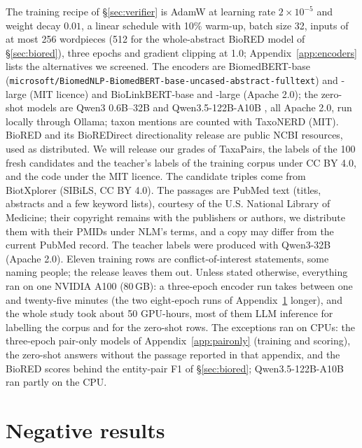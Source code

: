 \documentclass[11pt]{article}
\newcommand{\bench}{\mbox{TaxaPairs}}
\begin{document}
The training recipe of \S\ref{sec:verifier} is AdamW \citep{loshchilov2019decoupled} at learning rate $2\times10^{-5}$ and weight
decay $0.01$, a linear schedule with 10\% warm-up, batch size 32, inputs of at most 256 wordpieces (512 for the whole-abstract BioRED model of \S\ref{sec:biored}),
three epochs and gradient clipping at 1.0; Appendix~\ref{app:encoders} lists the alternatives we
screened. The encoders are BiomedBERT-base
(\texttt{microsoft/\allowbreak BiomedNLP-\allowbreak BiomedBERT-\allowbreak base-\allowbreak uncased-\allowbreak abstract-\allowbreak fulltext})
and -large (MIT licence) and BioLinkBERT-base and -large (Apache 2.0); the zero-shot models are Qwen3 0.6B--32B \citep{qwen2025technical} and Qwen3.5-122B-A10B \citep{qwen2026qwen35}, all Apache 2.0, run locally through
Ollama; taxon mentions are counted with TaxoNERD (MIT)\@. BioRED and its BioREDirect directionality
release are public NCBI resources, used as distributed. We will release our grades of \bench{}, the labels of the 100 fresh candidates and the teacher's
labels of the training corpus under CC BY 4.0, and the code under the MIT licence. The candidate
triples come from BiotXplorer (SIBiLS, CC BY 4.0). The passages are PubMed text (titles, abstracts and a
few keyword lists), courtesy of the U.S. National Library of Medicine; their copyright remains with
the publishers or authors, we distribute them with their PMIDs under NLM's terms, and a copy may
differ from the current PubMed record. The teacher labels were produced with Qwen3-32B (Apache
2.0). Eleven training rows are conflict-of-interest statements, some naming people; the release
leaves them out. Unless stated otherwise, everything ran on one
NVIDIA A100 (80\,GB): a three-epoch encoder run takes between one and twenty-five minutes (the two
eight-epoch runs of Appendix~\ref{sec:negative} longer), and the whole study took about 50 GPU-hours,
most of them LLM inference for labelling the corpus and for the zero-shot rows. The exceptions ran on CPUs: the three-epoch pair-only models of Appendix~\ref{app:paironly} (training and scoring), the zero-shot answers without the passage reported in that appendix, and the BioRED scores behind the entity-pair F1 of \S\ref{sec:biored}; Qwen3.5-122B-A10B ran partly on the CPU.

\section{Negative results}
\label{sec:negative}
\end{document}
